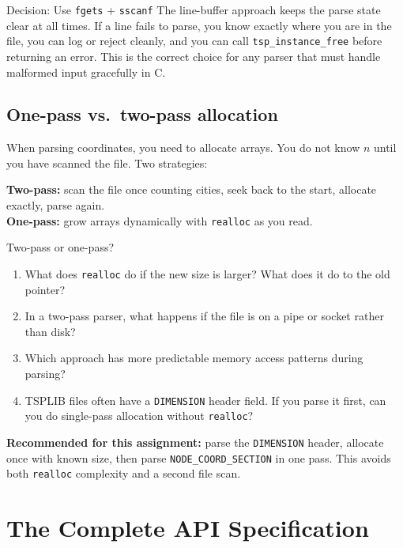 \documentclass[11pt]{article}
\begin{document}
\begin{goodbox}{Decision: Use \texttt{fgets} + \texttt{sscanf}}
The line-buffer approach keeps the parse state clear at all times. If a line fails to parse, you know exactly where you are in the file, you can log or reject cleanly, and you can call \texttt{tsp\_instance\_free} before returning an error. This is the correct choice for any parser that must handle malformed input gracefully in C.
\end{goodbox}

\subsection{One-pass vs.\ two-pass allocation}

When parsing coordinates, you need to allocate arrays. You do not know $n$ until you have scanned the file. Two strategies:

\textbf{Two-pass:} scan the file once counting cities, seek back to the start, allocate exactly, parse again.\\
\textbf{One-pass:} grow arrays dynamically with \texttt{realloc} as you read.

\begin{inquiry}{Two-pass or one-pass?}
\begin{enumerate}[label=\alph*.]
  \item What does \texttt{realloc} do if the new size is larger? What does it do to the old pointer?
  \item In a two-pass parser, what happens if the file is on a pipe or socket rather than disk?
  \item Which approach has more predictable memory access patterns during parsing?
  \item TSPLIB files often have a \texttt{DIMENSION} header field. If you parse it first, can you do single-pass allocation without \texttt{realloc}?
\end{enumerate}
\end{inquiry}

\textbf{Recommended for this assignment:} parse the \texttt{DIMENSION} header, allocate once with known size, then parse \texttt{NODE\_COORD\_SECTION} in one pass. This avoids both \texttt{realloc} complexity and a second file scan.

\newpage

\section{The Complete API Specification}
\end{document}
